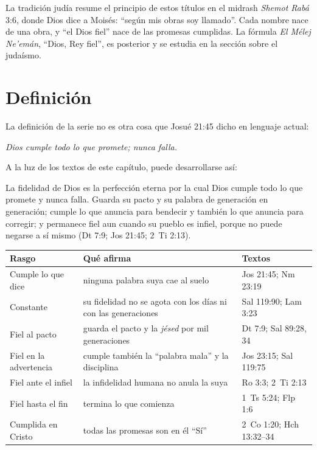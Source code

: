 \documentclass[11pt,letterpaper]{article}
\begin{document}
\begin{nota}[Precisión]
La tradición judía resume el principio de estos títulos en el midrash \emph{Shemot Rabá} 3:6, donde Dios dice a Moisés: ``según mis obras soy llamado''. Cada nombre nace de una obra, y ``el Dios fiel'' nace de las promesas cumplidas. La fórmula \emph{El Mélej Ne'emán}, ``Dios, Rey fiel'', es posterior y se estudia en la sección sobre el judaísmo.
\end{nota}

\section{Definición}

La definición de la serie no es otra cosa que Josué 21:45 dicho en lenguaje actual:

\begin{tcolorbox}[colback=papiro,colframe=dorado,boxrule=1.2pt,arc=3pt]
\centering\large\itshape Dios cumple todo lo que promete; nunca falla.
\end{tcolorbox}

A la luz de los textos de este capítulo, puede desarrollarse así:

\begin{tcolorbox}[colback=papiro,colframe=azul,boxrule=1pt,arc=3pt,fonttitle=\bfseries,title=Definición]
La fidelidad de Dios es la perfección eterna por la cual Dios cumple todo lo que promete y nunca falla. Guarda su pacto y su palabra de generación en generación; cumple lo que anuncia para bendecir y también lo que anuncia para corregir; y permanece fiel aun cuando su pueblo es infiel, porque no puede negarse a sí mismo (Dt 7:9; Jos 21:45; 2~Ti 2:13).
\end{tcolorbox}

\begin{center}\small\renewcommand{\arraystretch}{1.2}
\begin{tabular}{@{}L{3.6cm}L{6.4cm}L{4.4cm}@{}}
\toprule
\textbf{Rasgo} & \textbf{Qué afirma} & \textbf{Textos} \\ \midrule
Cumple lo que dice & ninguna palabra suya cae al suelo & Jos 21:45; Nm 23:19 \\
Constante & su fidelidad no se agota con los días ni con las generaciones & Sal 119:90; Lam 3:23 \\
Fiel al pacto & guarda el pacto y la \emph{jésed} por mil generaciones & Dt 7:9; Sal 89:28, 34 \\
Fiel en la advertencia & cumple también la ``palabra mala'' y la disciplina & Jos 23:15; Sal 119:75 \\
Fiel ante el infiel & la infidelidad humana no anula la suya & Ro 3:3; 2~Ti 2:13 \\
Fiel hasta el fin & termina lo que comienza & 1~Ts 5:24; Flp 1:6 \\
Cumplida en Cristo & todas las promesas son en él ``Sí'' & 2~Co 1:20; Hch 13:32--34 \\
\bottomrule
\end{tabular}\end{center}
\end{document}
